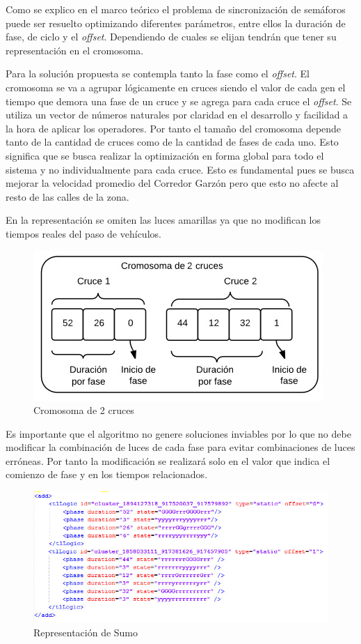 Como se explico en el marco teórico el problema de sincronización de semáforos puede ser resuelto optimizando diferentes parámetros, entre ellos la duración de fase, de ciclo y el \emph{offset}. Dependiendo de cuales se elijan tendrán que tener su representación en el cromosoma.

Para la solución propuesta se contempla tanto la fase como el \emph{offset}. El cromosoma se va a  agrupar  lógicamente en cruces siendo el valor de cada gen el tiempo que demora una
fase de un cruce y se agrega para cada cruce el \emph{offset}. Se utiliza un vector de números naturales por claridad en el desarrollo y facilidad a la hora de aplicar los operadores.
Por tanto el tamaño del cromosoma depende tanto de la cantidad de cruces como de la cantidad de fases de cada uno. Esto significa que se busca realizar la optimización en forma global para todo el sistema y no individualmente para cada cruce. Esto es fundamental pues se busca mejorar la velocidad promedio del Corredor Garzón pero que esto no afecte al resto de las calles de la zona.

En la representación se omiten las luces amarillas ya que no modifican los tiempos reales del paso de vehículos.
 
 \begin{figure}[h]
 	\centering
 	\includegraphics[width=0.7\linewidth]{Figures/cromosoma1}
 	\caption{Cromosoma de 2 cruces}
 	\label{fig:cromosoma1}
 \end{figure}
 
Es  importante que el algoritmo no genere soluciones inviables por lo que no debe modificar la combinación de luces de cada fase para evitar combinaciones de luces erróneas. Por tanto la modificación se realizará solo en el valor que indica el comienzo de fase y en los tiempos relacionados.

\begin{figure}[H]
	\centering
	\includegraphics[width=\linewidth]{Figures/rep_sumo2}
	\caption{Representación de Sumo}
	\label{fig:rep_sumo}
\end{figure}

